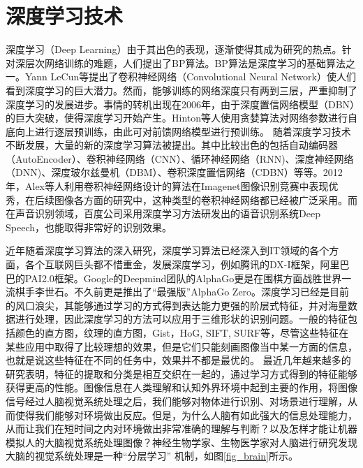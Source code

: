 \section{深度学习技术}

深度学习（Deep Learning）由于其出色的表现，逐渐使得其成为研究的热点。针对深层次网络训练的难题，人们提出了BP算法\cite{Rumelhart1988Learning}。BP算法是深度学习的基础算法之一。Yann LeCun等\cite{Lecun2014Backpropagation}提出了卷积神经网络（Convolutional Neural Network）使人们看到深度学习的巨大潜力。然而，能够训练的网络深度只有两到三层，严重抑制了深度学习的发展进步。事情的转机出现在2006年，由于深度置信网络模型（DBN）的巨大突破，使得深度学习开始产生。Hinton等人\cite{Hinton2006A}使用贪婪算法对网络参数进行自底向上进行逐层预训练，由此可对前馈网络模型进行预训练。
%
随着深度学习技术不断发展，大量的新的深度学习算法被提出。其中比较出色的包括自动编码器（AutoEncoder）、卷积神经网络（CNN）、循环神经网络（RNN)、深度神经网络（DNN)、深度玻尔兹曼机（DBM）、卷积深度置信网络（CDBN）等等。2012年，Alex等人利用卷积神经网络设计的算法在Imagenet图像识别竞赛中表现优秀\cite{Krizhevsky2017ImageNet}，在后续图像各方面的研究中，这种类型的卷积神经网络都已经被广泛采用。而在声音识别领域，百度公司采用深度学习方法研发出的语音识别系统Deep Speech，也能取得非常好的识别效果\cite{Niu2014Context}。

近年随着深度学习算法的深入研究，深度学习算法已经深入到IT领域的各个方面，各个互联网巨头都不惜重金，发展深度学习，例如腾讯的DX-I框架，阿里巴巴的PAI2.0框架。Google的Deepmind团队的AlphaGo更是在围棋方面战胜世界一流棋手李世石。不久前更是推出了``最强版”AlphaGo Zero。深度学习已经是目前的风口浪尖，其能够通过学习的方式得到表达能力更强的阶层式特征，并对海量数据进行处理，因此深度学习的方法可以应用于三维形状的识别问题。一般的特征包括颜色的直方图，纹理的直方图，Gist，HoG, SIFT, SURF等，尽管这些特征在某些应用中取得了比较理想的效果，但是它们只能刻画图像当中某一方面的信息，也就是说这些特征在不同的任务中，效果并不都是最优的。
%
最近几年越来越多的研究表明，特征的提取和分类是相互交织在一起的，通过学习方式得到的特征能够获得更高的性能。图像信息在人类理解和认知外界环境中起到主要的作用，将图像信号经过人脑视觉系统处理之后，我们能够对物体进行识别、对场景进行理解，从而使得我们能够对环境做出反应。但是，为什么人脑有如此强大的信息处理能力，从而让我们在短时间之内对环境做出非常准确的理解与判断？以及怎样才能让机器模拟人的大脑视觉系统处理图像？神经生物学家、生物医学家对人脑进行研究发现大脑的视觉系统处理是一种“分层学习” 机制，如图\ref{fig_brain}所示。

